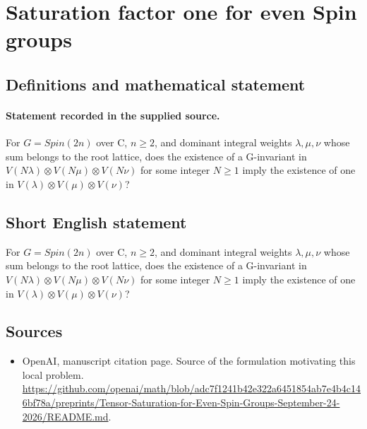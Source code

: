\documentclass[11pt]{article}
\begin{document}
\section*{Saturation factor one for even Spin groups}\label{30007004}
\subsection{Definitions and mathematical statement}
\paragraph{Statement recorded in the supplied source.}
For $G=Spin(2n)$ over C, $n\geq 2$, and dominant integral weights $\lambda ,\mu ,\nu $ whose sum belongs to the root lattice, does the existence of a G-invariant in $V(N\lambda )\otimes V(N\mu )\otimes V(N\nu )$ for some integer $N\geq 1$ imply the existence of one in $V(\lambda )\otimes V(\mu )\otimes V(\nu )$?
\subsection{Short English statement}
For $G=Spin(2n)$ over C, $n\geq 2$, and dominant integral weights $\lambda ,\mu ,\nu $ whose sum belongs to the root lattice, does the existence of a G-invariant in $V(N\lambda )\otimes V(N\mu )\otimes V(N\nu )$ for some integer $N\geq 1$ imply the existence of one in $V(\lambda )\otimes V(\mu )\otimes V(\nu )$?
\subsection{Sources}
\begin{itemize}
\item[S1] OpenAI, manuscript citation page. Source of the formulation motivating this local problem.
\url{https://github.com/openai/math/blob/adc7f1241b42e322a6451854ab7e4b4c146bf78a/preprints/Tensor-Saturation-for-Even-Spin-Groups-September-24-2026/README.md}.
\end{itemize}
\end{document}
